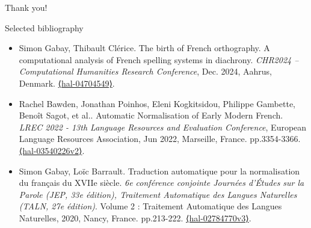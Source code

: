 \documentclass[aspectratio=169]{beamer}
\begin{document}

    \begin{frame}{}
        \centering
        Thank you!
    \end{frame}


\begin{frame}{Selected bibliography}
    \begin{itemize}
        \footnotesize
        \item Simon Gabay, Thibault Clérice. The birth of French orthography. A computational analysis of French spelling systems in diachrony. \textit{CHR2024 – Computational Humanities Research Conference}, Dec. 2024, Aahrus, Denmark. \href{https://inria.hal.science/hal-04704549}{⟨hal-04704549⟩}.
        \item Rachel Bawden, Jonathan Poinhos, Eleni Kogkitsidou, Philippe Gambette, Benoît Sagot, et al.. Automatic Normalisation of Early Modern French. \textit{LREC 2022 - 13th Language Resources and Evaluation Conference}, European Language Resources Association, Jun 2022, Marseille, France. pp.3354-3366. \href{https://inria.hal.science/hal-03540226}{⟨hal-03540226v2⟩}.
        \item Simon Gabay, Loïc Barrault. Traduction automatique pour la normalisation du français du XVIIe siècle. \textit{6e conférence conjointe Journées d'Études sur la Parole (JEP, 33e édition), Traitement Automatique des Langues Naturelles (TALN, 27e édition)}. Volume 2 : Traitement Automatique des Langues Naturelles, 2020, Nancy, France. pp.213-222. \href{https://hal.science/hal-02784770}{⟨hal-02784770v3⟩}.
    \end{itemize}
    
\end{frame}
\end{document}
